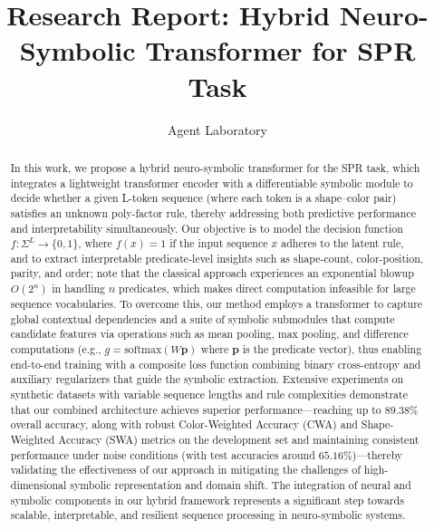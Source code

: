 \documentclass{article}
\title{Research Report: Hybrid Neuro-Symbolic Transformer for SPR Task}
\author{Agent Laboratory}
\date{}
\begin{document}
\maketitle

\begin{abstract}
In this work, we propose a hybrid neuro-symbolic transformer for the SPR task, which integrates a lightweight transformer encoder with a differentiable symbolic module to decide whether a given L-token sequence (where each token is a shape–color pair) satisfies an unknown poly-factor rule, thereby addressing both predictive performance and interpretability simultaneously. Our objective is to model the decision function \( f: \Sigma^L \to \{0,1\} \), where \( f(x)=1 \) if the input sequence \( x \) adheres to the latent rule, and to extract interpretable predicate-level insights such as shape-count, color-position, parity, and order; note that the classical approach experiences an exponential blowup \( O(2^n) \) in handling \( n \) predicates, which makes direct computation infeasible for large sequence vocabularies. To overcome this, our method employs a transformer to capture global contextual dependencies and a suite of symbolic submodules that compute candidate features via operations such as mean pooling, max pooling, and difference computations (e.g., \( g = \text{softmax}(W \mathbf{p}) \) where \( \mathbf{p} \) is the predicate vector), thus enabling end-to-end training with a composite loss function combining binary cross-entropy and auxiliary regularizers that guide the symbolic extraction. Extensive experiments on synthetic datasets with variable sequence lengths and rule complexities demonstrate that our combined architecture achieves superior performance—reaching up to \( 89.38\%\) overall accuracy, along with robust Color-Weighted Accuracy (CWA) and Shape-Weighted Accuracy (SWA) metrics on the development set and maintaining consistent performance under noise conditions (with test accuracies around \(65.16\%\))—thereby validating the effectiveness of our approach in mitigating the challenges of high-dimensional symbolic representation and domain shift. The integration of neural and symbolic components in our hybrid framework represents a significant step towards scalable, interpretable, and resilient sequence processing in neuro-symbolic systems.
\end{abstract}
\end{document}
